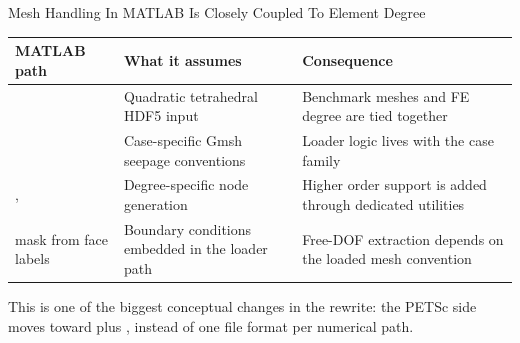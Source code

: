 \documentclass[aspectratio=169,10pt]{beamer}
\begin{document}
\begin{frame}{Mesh Handling In MATLAB Is Closely Coupled To Element Degree}
\small
\begin{tabularx}{\textwidth}{p{}p{}Y}
\toprule
\textbf{MATLAB path} & \textbf{What it assumes} & \textbf{Consequence} \\
\midrule
{} & Quadratic tetrahedral HDF5 input & Benchmark meshes and FE degree are tied together \\
 & Case-specific Gmsh seepage conventions & Loader logic lives with the case family \\
,  & Degree-specific node generation & Higher order support is added through dedicated utilities \\
 mask from face labels & Boundary conditions embedded in the loader path & Free-DOF extraction depends on the loaded mesh convention \\
\bottomrule
\end{tabularx}
\vspace{0.18cm}
\begin{callout}
This is one of the biggest conceptual changes in the rewrite: the PETSc side moves toward  plus , instead of one file format per numerical path.
\end{callout}
\end{frame}
\end{document}
